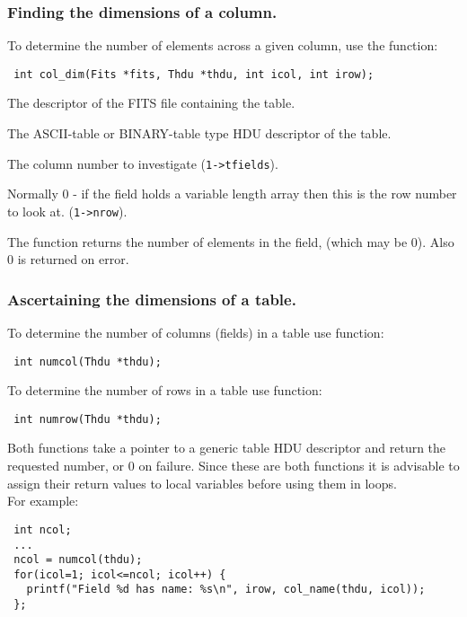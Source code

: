 \subsubsection{Finding the dimensions of a column.}
To determine the number of elements across a given column, use the
function:
\label{col_dim}\begin{verbatim}
 int col_dim(Fits *fits, Thdu *thdu, int icol, int irow);
\end{verbatim}
\begin{arglist}

 The descriptor of the FITS file containing the table.
 
 The ASCII-table or BINARY-table type HDU descriptor of
             the table.

 The column number to investigate (\verb`1->tfields`).

 Normally 0 - if the field holds a variable length
             array then this is the row number to look at. (\verb`1->nrow`).

\end{arglist}

The function returns the number of elements in the field, (which may
be 0). Also 0 is returned on error.

\subsubsection{Ascertaining the dimensions of a table.}

To determine the number of columns (fields) in a table use function:
\label{numcol}\begin{verbatim}
 int numcol(Thdu *thdu);
\end{verbatim}
To determine the number of rows in a table use function:
\label{numrow}\begin{verbatim}
 int numrow(Thdu *thdu);
\end{verbatim}
Both functions take a pointer to a generic table HDU descriptor and
return the requested number, or 0 on failure. Since these are both
functions it is advisable to assign their return values to local
variables before using them in loops.\\
For example:
\begin{verbatim}
 int ncol;
 ...
 ncol = numcol(thdu);
 for(icol=1; icol<=ncol; icol++) {
   printf("Field %d has name: %s\n", irow, col_name(thdu, icol));
 };
\end{verbatim}

